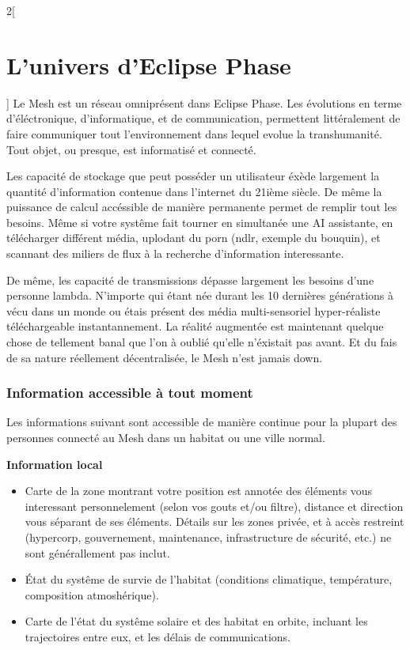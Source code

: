 \documentclass[a4paper,9pt]{article}
\begin{document}
\begin{multicols}{2}[\section{L'univers d'Eclipse Phase}]
Le Mesh est un réseau omniprésent dans Eclipse Phase. Les évolutions en terme
d'éléctronique, d'informatique, et de communication, permettent littéralement de faire
communiquer tout l'environnement dans lequel evolue la transhumanité. Tout objet, ou presque,
est informatisé et connecté.

Les capacité de stockage que peut posséder un utilisateur éxède largement la quantité d'information
contenue dans l'internet du 21ième siècle. De même la puissance de calcul accéssible de manière permanente
permet de remplir tout les besoins. Même si votre systême fait tourner en simultanée une AI assistante, en
télécharger différent média, uplodant du porn (ndlr, exemple du bouquin), et scannant des miliers de flux
à la recherche d'information interessante.

De même, les capacité de transmissions dépasse largement les besoins d'une
personne lambda. N'importe qui étant née durant les 10 dernières générations
à vécu dans un monde ou étais présent des média multi-sensoriel hyper-réaliste
téléchargeable instantannement. La réalité augmentée est maintenant quelque 
chose de tellement banal que l'on à oublié qu'elle n'éxistait pas avant.
Et du fais de sa nature réellement décentralisée,
le Mesh n'est jamais down.

\subsubsection{Information accessible à tout moment}

Les informations suivant sont accessible de manière continue pour la plupart
des personnes connecté au Mesh dans un habitat ou une ville normal.

\textbf{Information local}
\begin{itemize}
   \item Carte de la zone montrant votre position est annotée des éléments
   vous interessant personnelement (selon vos gouts et/ou filtre), distance
   et direction vous séparant de ses éléments. Détails sur les zones privée,
   et à accès restreint (hypercorp, gouvernement, maintenance, infrastructure de
   sécurité, etc.) ne sont générallement pas inclut.

   \item État du systême de survie de l'habitat (conditions climatique, température,
   composition atmoshérique).

   \item Carte de l'état du systême solaire et des habitat en orbite, incluant les
   trajectoires entre eux, et les délais de communications.
\end{itemize}



\end{multicols}
\end{document}
